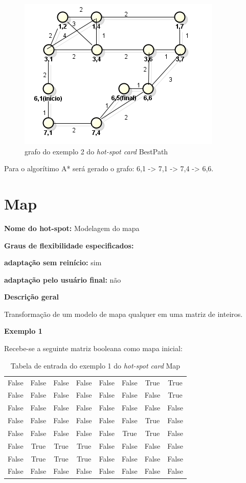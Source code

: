 \begin{anexosenv}
\begin{figure}[H]
	\centering
	\label{figXX3}
		\includegraphics[keepaspectratio=true,scale=0.7]{figuras/grafohotspotcard2.PNG}
	\caption{grafo do exemplo 2 do \textit{hot-spot card} BestPath}
\end{figure}

Para o algorítimo A* será gerado o grafo: 6,1 -> 7,1 -> 7,4 -> 6,6.

\section{Map}

{\large \textbf{Nome do hot-spot:}} Modelagem do mapa

{\large \textbf{Graus de flexibilidade especificados:}}

\textbf{adaptação sem reinício:} sim

\textbf{adaptação pelo usuário final:} não

{\large \textbf{Descrição geral}}

Transformação de um modelo de mapa qualquer em uma matriz de inteiros.

{\large \textbf{Exemplo 1}}

Recebe-se a seguinte matriz booleana como mapa inicial:

\begin{table}[H]
\centering
\caption{Tabela de entrada do exemplo 1 do \textit{hot-spot card} Map}
\begin{tabular}{|c|c|c|c|c|c|c|c|}
False & False & False & False & False & False & True & True \\
False & False & False & False & False & False & False & True \\
False & False & False & False & False & False & False & False \\
False & False & False & False & False & False & True & False \\
False & False & False & False & False & True & True & False \\
False & True & True & True & False & False & False & False \\
False & True & True & True & False & False & False & False \\
False & False & False & False & False & False & False & False
\end{tabular}
\end{table}


\end{anexosenv}
